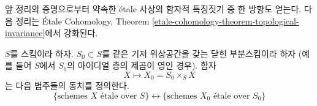 \noindent
앞 정리의 증명으로부터 약속한 \'etale 사상의 함자적 특징짓기 중
한 방향도 얻는다. 다음 정리는 \'Etale Cohomology,
Theorem \ref{etale-cohomology-theorem-topological-invariance}에서
강화된다.

\begin{theorem}
\label{theorem-remarkable-equivalence}
\begin{reference}
\cite[IV, Theorem 18.1.2]{EGA}
\end{reference}
$S$를 스킴이라 하자.
$S_0 \subset S$를 같은 기저 위상공간을 갖는 닫힌 부분스킴이라 하자
(예를 들어 $S$에서 $S_0$의 아이디얼 층의 제곱이 영인 경우).
함자
$$
X \longmapsto X_0 = S_0 \times_S X
$$
는 다음 범주들의 동치를 정의한다.
$$
\{
\text{schemes }X\text{ \'etale over }S
\}
\leftrightarrow
\{
\text{schemes }X_0\text{ \'etale over }S_0
\}
$$
\end{theorem}


